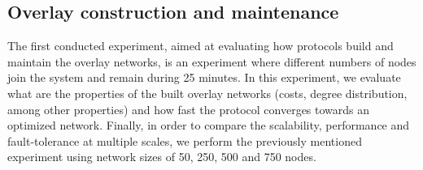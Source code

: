 \begin{table} \label{table:proto_test_params}
    \caption{Membership evaluation: protocol configuration parameters}
\end{table}

\subsection{Overlay construction and maintenance}

The first conducted experiment, aimed at evaluating how protocols build and maintain the overlay networks, is an experiment where different numbers of nodes join the system and remain during 25 minutes. In this experiment, we evaluate what are the properties of the built overlay networks (costs, degree distribution, among other properties) and how fast the protocol converges towards an optimized network. Finally, in order to compare the scalability, performance and fault-tolerance at multiple scales, we perform the previously mentioned experiment using network sizes of 50, 250, 500 and 750 nodes.

